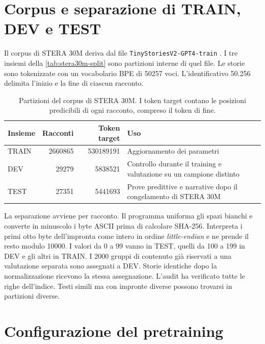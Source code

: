 \section{Corpus e separazione di TRAIN, DEV e TEST}\label{sec:stera30m-dati}

Il corpus di STERA 30M deriva dal file \texttt{TinyStoriesV2-GPT4-train} \cite{eldan2023tinystories}. I tre insiemi della \autoref{tab:stera30m-split} sono partizioni interne di quel file. Le storie sono tokenizzate con un vocabolario BPE di \num{50257} voci. L'identificativo 50.256 delimita l'inizio e la fine di ciascun racconto.

\begin{table}[htbp]
\centering
\small
\begin{tabularx}{\linewidth}{lrrX}
\toprule
Insieme & Racconti & Token target & Uso \\
\midrule
TRAIN & \num{2660865} & \num{530189191} & Aggiornamento dei parametri \\
DEV & \num{29279} & \num{5838521} & Controllo durante il training e valutazione su un campione distinto \\
TEST & \num{27351} & \num{5441693} & Prove predittive e narrative dopo il congelamento di STERA 30M \\
\bottomrule
\end{tabularx}
\caption{Partizioni del corpus di STERA 30M. I token target contano le posizioni predicibili di ogni racconto, compreso il token di fine.}
\label{tab:stera30m-split}
\end{table}

La separazione avviene per racconto. Il programma uniforma gli spazi bianchi e converte in minuscolo i byte ASCII prima di calcolare SHA-256. Interpreta i primi otto byte dell'impronta come intero in ordine \emph{little-endian} e ne prende il resto modulo \num{10000}. I valori da 0 a 99 vanno in TEST, quelli da 100 a 199 in DEV e gli altri in TRAIN. I \num{2000} gruppi di contenuto già riservati a una valutazione separata sono assegnati a DEV. Storie identiche dopo la normalizzazione ricevono la stessa assegnazione. L'audit ha verificato tutte le righe dell'indice. Testi simili ma con impronte diverse possono trovarsi in partizioni diverse.

\section{Configurazione del pretraining}
\label{sec:stera30m-config-training}

